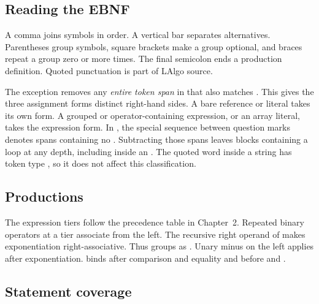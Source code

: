\subsection{Reading the EBNF}

A comma joins symbols in order. A vertical bar separates alternatives. Parentheses group symbols, square brackets make a group optional, and braces repeat a group zero or more times. The final semicolon ends a production definition. Quoted punctuation is part of LAlgo source.

The exception  removes any \emph{entire token span} in  that also matches . This gives the three assignment forms distinct right-hand sides. A bare reference or literal takes its own form. A grouped or operator-containing expression, or an array literal, takes the expression form. In , the special sequence between question marks denotes spans containing no . Subtracting those spans leaves blocks containing a loop at any depth, including inside an . The quoted word  inside a string has token type , so it does not affect this classification.

\subsection{Productions}



The expression tiers follow the precedence table in Chapter~2. Repeated binary operators at a tier associate from the left. The recursive right operand of  makes exponentiation right-associative. Thus  groups as . Unary minus on the left applies after exponentiation.  binds after comparison and equality and before  and .

\subsection{Statement coverage}

